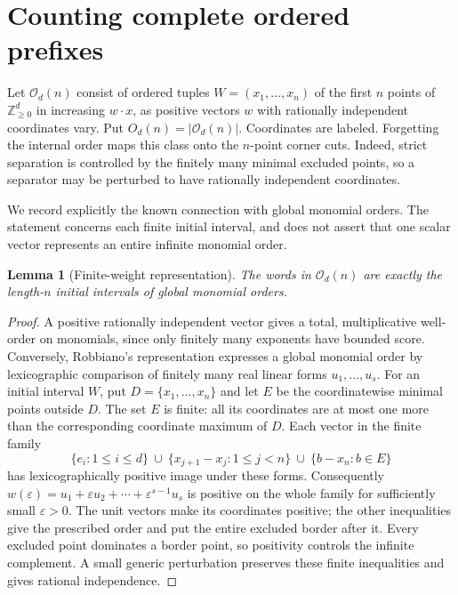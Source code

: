 \documentclass[11pt,a4paper]{article}
\newtheorem{lemma}[theorem]{Lemma}
\theoremstyle{remark}
\newcommand{\Z}{\mathbb Z}
\newcommand{\Nzero}{\Z_{\geq0}}
\newcommand{\card}[1]{\lvert#1\rvert}
\begin{document}
\section{Counting complete ordered prefixes}\label{sec:orders}
Let \(\mathcal O_d(n)\) consist of ordered tuples
\(W=(x_1,\ldots,x_n)\) of the first \(n\) points of \(\Nzero^d\)
in increasing \(w\cdot x\), as positive vectors \(w\) with rationally
independent coordinates vary. Put \(O_d(n)=\card{\mathcal O_d(n)}\).
Coordinates are labeled. Forgetting the internal order maps this class
onto the \(n\)-point corner cuts. Indeed, strict separation is controlled
by the finitely many minimal excluded points, so a separator may be
perturbed to have rationally independent coordinates.

We record explicitly the known connection with global monomial orders.
The statement concerns each finite initial interval, and does not assert
that one scalar vector represents an entire infinite monomial order.

\begin{lemma}[Finite-weight representation]\label{lem:finiteweight}
The words in \(\mathcal O_d(n)\) are exactly the length-\(n\) initial
intervals of global monomial orders.
\end{lemma}
\begin{proof}
A positive rationally independent vector gives a total, multiplicative
well-order on monomials, since only finitely many exponents have bounded
score. Conversely, Robbiano's representation \cite{Robbiano} expresses a
global monomial order by lexicographic comparison of finitely many real
linear forms \(u_1,\ldots,u_s\).
For an initial interval \(W\), put \(D=\{x_1,\ldots,x_n\}\)
and let \(E\) be the coordinatewise minimal points outside \(D\).
The set \(E\) is finite: all its coordinates are at most one more
than the corresponding coordinate maximum of \(D\).
Each vector in the finite family
\[
 \{e_i:1\leq i\leq d\}\ \cup\
 \{x_{j+1}-x_j:1\leq j<n\}\ \cup\
 \{b-x_n:b\in E\}
\]
has lexicographically positive image under these forms. Consequently
\(w(\varepsilon)=u_1+\varepsilon u_2+\cdots+
\varepsilon^{s-1}u_s\) is positive on the whole family for sufficiently
small \(\varepsilon>0\). The unit vectors make its coordinates positive;
the other inequalities give the prescribed order and put the entire
excluded border after it. Every excluded point dominates a border point,
so positivity controls the infinite complement. A small generic
perturbation preserves these finite inequalities and gives rational
independence.
\end{proof}
\end{document}
